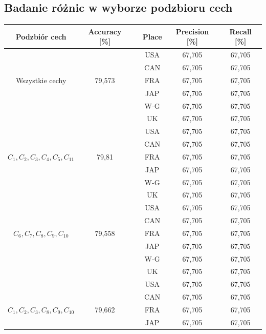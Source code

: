 \documentclass{classrep}
\begin{document}
\newpage
\subsection{Badanie różnic w wyborze podzbioru cech}
\begin{table}[h!]
	\centering
	\begin{tabular} {c c c c c c}
		\hline
		\textbf{Podzbiór cech} & \textbf{Accuracy [\%]} & \vline & \textbf{Place} & \textbf{Precision [\%]} & \textbf{Recall [\%]}\\ [0.5ex] 
		\hline
		\hline 
		&   							&\vline& USA & 67,705 & 67,705 \\
		&								&\vline& CAN & 67,705 & 67,705 \\
		Wszystkie cechy & 79,573        &\vline& FRA & 67,705 & 67,705 \\
		&								&\vline& JAP & 67,705 & 67,705 \\
		&								&\vline& W-G & 67,705 & 67,705 \\
		&		 						&\vline& UK  & 67,705 & 67,705 \\
		\hline 
		&   										 	&\vline& USA & 67,705 & 67,705 \\
		&												&\vline& CAN & 67,705 & 67,705 \\
		$C_1, C_2, C_3, C_4, C_5, C_{11}$ & 79,81       &\vline& FRA & 67,705 & 67,705 \\
		&												&\vline& JAP & 67,705 & 67,705 \\
		&												&\vline& W-G & 67,705 & 67,705 \\
		&		 										&\vline& UK  & 67,705 & 67,705 \\
		\hline 
		&   											&\vline& USA & 67,705 & 67,705 \\
		&												&\vline& CAN & 67,705 & 67,705 \\
		$C_6, C_7, C_8, C_9, C_{10}$ & 79,558        	&\vline& FRA & 67,705 & 67,705 \\
		&												&\vline& JAP & 67,705 & 67,705 \\
		&												&\vline& W-G & 67,705 & 67,705 \\
		&		 										&\vline& UK  & 67,705 & 67,705 \\
		\hline 
		&   											&\vline& USA & 67,705 & 67,705 \\
		&												&\vline& CAN & 67,705 & 67,705 \\
		$C_1, C_2, C_3, C_8, C_9, C_{10}$ & 79,662      &\vline& FRA & 67,705 & 67,705 \\
		&												&\vline& JAP & 67,705 & 67,705 \\

\end{tabular}
\end{table}
\end{document}
